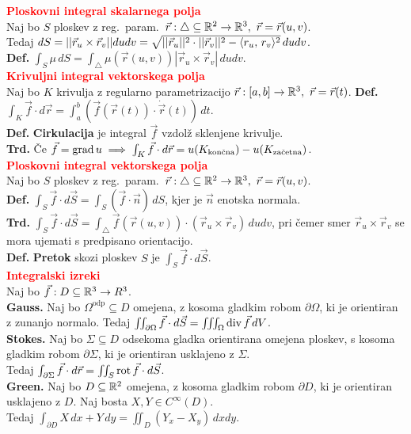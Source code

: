 \documentclass[a4paper,oneside,8pt,landscape]{extarticle}
\begin{document}
\begin{multicols*}{3}
\textbf{\textcolor{red}{Ploskovni integral skalarnega polja}}\\
Naj bo \(S\) ploskev z reg.\ param.\ \(\vec{r}: \triangle \subseteq \mathbb{R}^2 \to \mathbb{R}^3,\ \vec{r} = \vec{r}(u, v)\).\\ Tedaj \(dS = ||\vec{r}_u \times \vec{r}_v|| dudv = \sqrt{||\vec{r}_u||^2 \cdot ||\vec{r}_v||^2 - \langle r_u, \, r_v \rangle^2} \, dudv\).\\
\textbf{Def.} \(\int_{S} \mu \, dS = \int_{\triangle} \mu(\vec{r}(u, v)) |\vec{r}_u \times \vec{r}_v| \, dudv\).\\
%
%
\textbf{\textcolor{red}{Krivuljni integral vektorskega polja}}\\
Naj bo \(K\) krivulja z regularno parametrizacijo \(\vec{r}: [a,b] \to \mathbb{R}^3,\ \vec{r} = \vec{r}(t)\).
\textbf{Def.} \(\int_{K} \vec{f} \cdot d\vec{r} = \int_{a}^{b} (\vec{f}(\vec{r}(t)) \cdot \dot{\vec{r}}(t))\, dt\).\\
\textbf{Def.} \textbf{Cirkulacija} je integral \(\vec{f}\) vzdolž sklenjene krivulje.\\
\textbf{Trd.} Če \(\vec{f} = \operatorname{grad} u \implies \int_{K} \vec{f} \cdot d\vec{r} = u(K_\text{končna}) - u(K_\text{začetna})\).\\
%
%
\textbf{\textcolor{red}{Ploskovni integral vektorskega polja}}\\
Naj bo \(S\) ploskev z reg.\ param.\ \(\vec{r}: \triangle \subseteq \mathbb{R}^2 \to \mathbb{R}^3,\ \vec{r} = \vec{r}(u, v)\).\\
\textbf{Def.} \(\int_{S} \vec{f} \cdot d \vec{S} = \int_{S} (\vec{f} \cdot \vec{n})\, dS\), kjer je \(\vec{n}\) enotska normala.\\
\textbf{Trd.} \(\int_{S} \vec{f} \cdot d \vec{S} = \int_{\triangle} \vec{f}(\vec{r}(u, v)) \cdot (\vec{r}_u \times \vec{r}_v) \, dudv\), pri čemer smer \(\vec{r}_u \times \vec{r}_v\) se mora ujemati s predpisano orientacijo.\\
\textbf{Def.} \textbf{Pretok} skozi ploskev \(S\) je \(\int_{S} \vec{f} \cdot d \vec{S}\).\\
%
%
\textbf{\textcolor{red}{Integralski izreki}}\\
Naj bo \(\vec{f}: D \subseteq \mathbb{R}^3 \to R^3\).\\
\textbf{Gauss.} Naj bo \(\Omega^\text{odp} \subseteq D\) omejena, z kosoma gladkim robom \(\partial \Omega\), ki je orientiran z zunanjo normalo. Tedaj \(\iint_{\partial \Omega} \vec{f} \cdot d\vec{S} = \iiint_{\Omega} \operatorname{div} \vec{f}\, dV\).\\
\textbf{Stokes.} Naj bo \(\Sigma \subseteq D\) odsekoma gladka orientirana omejena ploskev, s kosoma gladkim robom \(\partial \Sigma\), ki je orientiran usklajeno z \(\Sigma\).\\ Tedaj \(\int_{\partial \Sigma} \vec{f} \cdot d\vec{r} = \iint_{S} \operatorname{rot} \vec{f} \cdot d \vec{S}\).\\
\textbf{Green.} Naj bo \(D \subseteq \mathbb{R}^2\) omejena, z kosoma gladkim robom \(\partial D\), ki je orientiran usklajeno z \(D\). Naj bosta \(X, Y \in C^\infty(D)\).\\ Tedaj \(\int_{\partial D} X \, dx + Y \, dy = \iint_D (Y_x - X_y) \, dxdy\).
%
%

\end{multicols*}
\end{document}
